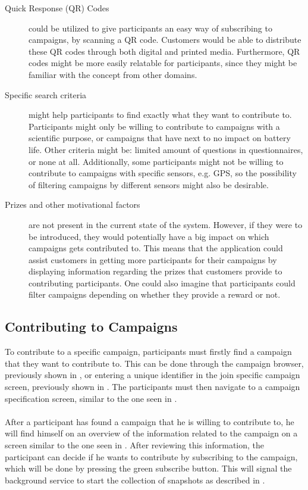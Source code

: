 \begin{description}
    \item[Quick Response (QR) Codes] could be utilized to give participants an easy way of subscribing to campaigns, by scanning a QR code. Customers would be able to distribute these QR codes through both digital and printed media. Furthermore, QR codes might be more easily relatable for participants, since they might be familiar with the concept from other domains.

    \item[Specific search criteria] might help participants to find exactly what they want to contribute to. Participants might only be willing to contribute to campaigns with a scientific purpose, or campaigns that have next to no impact on battery life. Other criteria might be: limited amount of questions in questionnaires, or none at all. Additionally, some participants might not be willing to contribute to campaigns with specific sensors, e.g. GPS, so the possibility of filtering campaigns by different sensors might also be desirable.

    \item[Prizes and other motivational factors] are not present in the current state of the system. However, if they were to be introduced, they would potentially have a big impact on which campaigns gets contributed to. This means that the application could assist customers in getting more participants for their campaigns by displaying information regarding the prizes that customers provide to contributing participants. One could also imagine that participants could filter campaigns depending on whether they provide a reward or not.
\end{description} 

\subsection{Contributing to Campaigns}
\label{sub:contributing_to_campaigns}

To contribute to a specific campaign, participants must firstly find a campaign that they want to contribute to. This can be done through the campaign browser, previously shown in , or entering a unique identifier in the join specific campaign screen, previously shown in . The participants must then navigate to a campaign specification screen, similar to the one seen in . 
\\\\
After a participant has found a campaign that he is willing to contribute to, he will find himself on an overview of the information related to the campaign on a screen similar to the one seen in . After reviewing this information, the participant can decide if he wants to contribute by subscribing to the campaign, which will be done by pressing the green subscribe button. This will signal the background service to start the collection of snapshots as described in .


